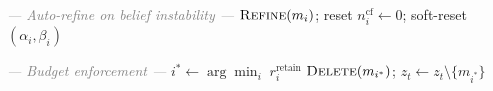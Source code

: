 \begin{algorithm}[t]
\begin{algorithmic}[1]
  \Statex \hspace{\algorithmicindent}\textcolor{gray}{\textit{--- Auto-refine on belief instability ---}}
      \State $\textsc{Refine}(m_i)$;\; reset $n_i^{\mathrm{cf}} \leftarrow 0$;\; soft-reset $(\alpha_i, \beta_i)$
    \EndIf
  \EndFor

  \Statex \hspace{\algorithmicindent}\textcolor{gray}{\textit{--- Budget enforcement ---}}
    \State $i^* \leftarrow \arg\min_i \; r_i^{\mathrm{retain}}$ 
    \State $\textsc{Delete}(m_{i^*})$;\; $z_t \leftarrow z_t \setminus \{m_{i^*}\}$
  \EndWhile

\EndFor
\end{algorithmic}
\end{algorithm}
